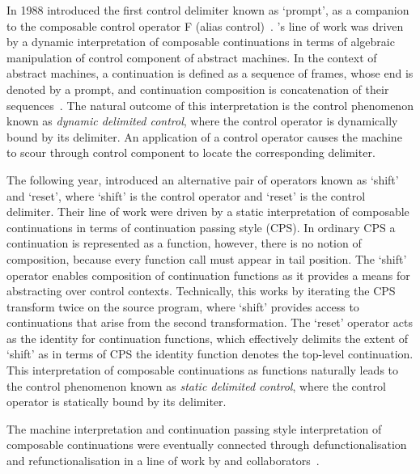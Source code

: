 \documentclass[12pt,phd,lfcs,twoside,openright,logo,leftchapter,normalheadings]{infthesis}
\theoremstyle{plain}
\theoremstyle{definition}
\begin{document}
In 1988 \citeauthor{Felleisen88} introduced the first control
delimiter known as `prompt', as a companion to the composable control
operator F (alias control)~\cite{Felleisen88}.
%
\citeauthor{Felleisen88}'s line of work was driven by a dynamic
interpretation of composable continuations in terms of algebraic
manipulation of control component of abstract machines.  In the
context of abstract machines, a continuation is defined as a sequence
of frames, whose end is denoted by a prompt, and continuation
composition is concatenation of their
sequences~\cite{Felleisen87,FelleisenF86,FelleisenWFD88}.
%
The natural outcome of this interpretation is the control phenomenon
known as \emph{dynamic delimited control}, where the control operator
is dynamically bound by its delimiter. An application of a control
operator causes the machine to scour through control component to
locate the corresponding delimiter.

The following year, \citet{DanvyF89} introduced an alternative pair of
operators known as `shift' and `reset', where `shift' is the control
operator and `reset' is the control delimiter. Their line of work were
driven by a static interpretation of composable continuations in terms
of continuation passing style (CPS). In ordinary CPS a continuation is
represented as a function, however, there is no notion of composition,
because every function call must appear in tail position. The `shift'
operator enables composition of continuation functions as it provides
a means for abstracting over control contexts. Technically, this works
by iterating the CPS transform twice on the source program, where
`shift' provides access to continuations that arise from the second
transformation. The `reset' operator acts as the identity for
continuation functions, which effectively delimits the extent of
`shift' as in terms of CPS the identity function denotes the top-level
continuation.
%
This interpretation of composable continuations as functions naturally
leads to the control phenomenon known as \emph{static delimited
  control}, where the control operator is statically bound by its
delimiter.

The machine interpretation and continuation passing style
interpretation of composable continuations were eventually connected
through defunctionalisation and refunctionalisation in a line of work
by \citeauthor{Danvy04a} and
collaborators~\cite{DanvyN01,AgerBDM03,Danvy04,AgerDM04,Danvy04a,AgerDM05,DanvyM09}.
\end{document}
